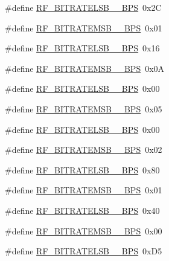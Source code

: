 \begin{DoxyCompactItemize}
\#define \mbox{\hyperlink{sx1276_regs-_fsk_8h_a4b990574403a3171c4bf1ef56f87076c}{R\+F\+\_\+\+B\+I\+T\+R\+A\+T\+E\+L\+S\+B\+\_\+\_\+\+B\+PS}}~0x2C
\item 
\#define \mbox{\hyperlink{sx1276_regs-_fsk_8h_a4f3568a645d981cc5d56d5892fd79fea}{R\+F\+\_\+\+B\+I\+T\+R\+A\+T\+E\+M\+S\+B\+\_\+\_\+\+B\+PS}}~0x01
\item 
\#define \mbox{\hyperlink{sx1276_regs-_fsk_8h_a6677546d2936ed5f36a259f13c123d00}{R\+F\+\_\+\+B\+I\+T\+R\+A\+T\+E\+L\+S\+B\+\_\+\_\+\+B\+PS}}~0x16
\item 
\#define \mbox{\hyperlink{sx1276_regs-_fsk_8h_a8d2d2c7221965aeac9af067528723746}{R\+F\+\_\+\+B\+I\+T\+R\+A\+T\+E\+M\+S\+B\+\_\+\_\+\+B\+PS}}~0x0A
\item 
\#define \mbox{\hyperlink{sx1276_regs-_fsk_8h_a382c67b25793c0884e7bfe662dfb06c6}{R\+F\+\_\+\+B\+I\+T\+R\+A\+T\+E\+L\+S\+B\+\_\+\_\+\+B\+PS}}~0x00
\item 
\#define \mbox{\hyperlink{sx1276_regs-_fsk_8h_a783ebd0eeb85cb90ed09736f058122ed}{R\+F\+\_\+\+B\+I\+T\+R\+A\+T\+E\+M\+S\+B\+\_\+\_\+\+B\+PS}}~0x05
\item 
\#define \mbox{\hyperlink{sx1276_regs-_fsk_8h_af7a1f67d376fd019e9b883a080b35700}{R\+F\+\_\+\+B\+I\+T\+R\+A\+T\+E\+L\+S\+B\+\_\+\_\+\+B\+PS}}~0x00
\item 
\#define \mbox{\hyperlink{sx1276_regs-_fsk_8h_a7b42c7402e7d73f2e75d753085badf7a}{R\+F\+\_\+\+B\+I\+T\+R\+A\+T\+E\+M\+S\+B\+\_\+\_\+\+B\+PS}}~0x02
\item 
\#define \mbox{\hyperlink{sx1276_regs-_fsk_8h_a1780bbfac40913821e859a35c0a7eae2}{R\+F\+\_\+\+B\+I\+T\+R\+A\+T\+E\+L\+S\+B\+\_\+\_\+\+B\+PS}}~0x80
\item 
\#define \mbox{\hyperlink{sx1276_regs-_fsk_8h_a899b8e6397e082b4d95f589ba51093b0}{R\+F\+\_\+\+B\+I\+T\+R\+A\+T\+E\+M\+S\+B\+\_\+\_\+\+B\+PS}}~0x01
\item 
\#define \mbox{\hyperlink{sx1276_regs-_fsk_8h_ac8a775e0079f97d0da847bcbc743f8b8}{R\+F\+\_\+\+B\+I\+T\+R\+A\+T\+E\+L\+S\+B\+\_\+\_\+\+B\+PS}}~0x40
\item 
\#define \mbox{\hyperlink{sx1276_regs-_fsk_8h_adb3227e86cec303479803ee36c94dc12}{R\+F\+\_\+\+B\+I\+T\+R\+A\+T\+E\+M\+S\+B\+\_\+\_\+\+B\+PS}}~0x00
\item 
\#define \mbox{\hyperlink{sx1276_regs-_fsk_8h_a4c354668226a9b7cbc899d1571eb7f6a}{R\+F\+\_\+\+B\+I\+T\+R\+A\+T\+E\+L\+S\+B\+\_\+\_\+\+B\+PS}}~0x\+D5
\item 

\end{DoxyCompactItemize}
